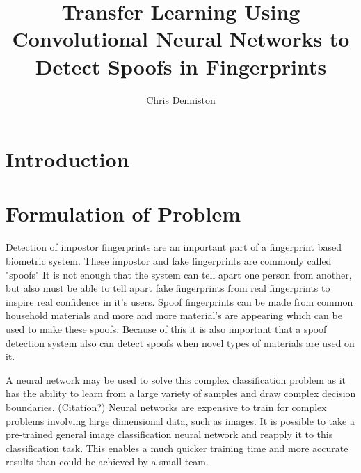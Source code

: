 \documentclass[]{article}
\title{Transfer Learning Using Convolutional Neural Networks to Detect Spoofs in Fingerprints}
\author{Chris Denniston}
\begin{document}
\maketitle

\begin{abstract}

\end{abstract}
\section{Introduction}

\section{Formulation of Problem}
Detection of impostor fingerprints are an important part of a fingerprint based biometric system. These impostor and fake fingerprints are commonly called "spoofs" It is not enough that the system can tell apart one person from another, but also must be able to tell apart fake fingerprints from real fingerprints to inspire real confidence in it's users. Spoof fingerprints can be made from common household materials and more and more material's are appearing which can be used to make these spoofs. Because of this it is also important that a spoof detection system also can detect spoofs when novel types of materials are used on it. 

A neural network may be used to solve this complex classification problem as it has the ability to learn from a large variety of samples and draw complex decision boundaries. \cite{book} (Citation?) Neural networks are expensive to train for complex problems involving large dimensional data, such as images. It is possible to take a pre-trained general image classification neural network and reapply it to this classification task. This enables a much quicker training time and more accurate results than could be achieved by a small team. 
\end{document}
